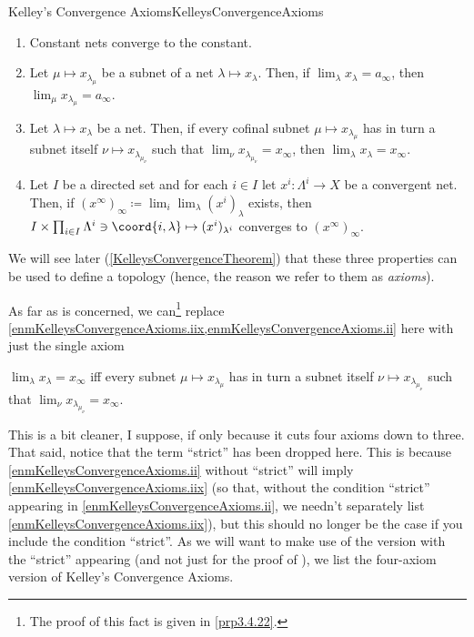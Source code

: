 \begin{thm}{Kelley's Convergence Axioms}{KelleysConvergenceAxioms}
\begin{enumerate}
\item \label{enmKelleysConvergenceAxioms.i}Constant nets converge to the constant.
\item \label{enmKelleysConvergenceAxioms.iix}Let $\mu \mapsto x_{\lambda _\mu}$ be a subnet of a net $\lambda \mapsto x_\lambda$.  Then, if $\lim _{\lambda}x_{\lambda}=a_{\infty}$, then $\lim _{\mu}x_{\lambda _{\mu}}=a_{\infty}$.
\item \label{enmKelleysConvergenceAxioms.ii}Let $\lambda \mapsto x_{\lambda}$ be a net.  Then, if every cofinal subnet $\mu \mapsto x_{\lambda _\mu}$ has in turn a subnet itself $\nu \mapsto x_{\lambda _{\mu _\nu}}$ such that $\lim _\nu x_{\lambda _{\mu _\nu}}=x_\infty$, then $\lim _\lambda x_\lambda =x_\infty$.
\item \label{enmKelleysConvergenceAxioms.iii}Let $I$ be a directed set and for each $i\in I$ let $x^i:\Lambda ^i\rightarrow X$ be a convergent net.  Then, if $(x^\infty )_\infty \coloneqq \lim _i\lim _\lambda (x^i)_\lambda$ exists, then $I\times \prod _{i\in I}\Lambda ^i\ni \coord{i,\lambda}\mapsto (x^i)_{\lambda ^i}$ converges to $(x^\infty )_\infty$.
\end{enumerate}
\begin{rmk}
We will see later (\cref{KelleysConvergenceTheorem}) that these three properties can be used to define a topology (hence, the reason we refer to them as \emph{axioms}).
\end{rmk}
\begin{rmk}
As far as  is concerned, we can\footnote{The proof of this fact is given in \cref{prp3.4.22}.} replace \cref{enmKelleysConvergenceAxioms.iix,enmKelleysConvergenceAxioms.ii} here with just the single axiom
\begin{textequation}
$\lim _{\lambda}x_{\lambda}=x_{\infty}$ iff every subnet $\mu \mapsto x_{\lambda _\mu}$ has in turn a subnet itself $\nu \mapsto x_{\lambda _{\mu _\nu}}$ such that $\lim _\nu x_{\lambda _{\mu _\nu}}=x_\infty$.
\end{textequation}
This is a bit cleaner, I suppose, if only because it cuts four axioms down to three.  That said, notice that the term ``strict'' has been dropped here.  This is because \cref{enmKelleysConvergenceAxioms.ii} without ``strict'' will imply \cref{enmKelleysConvergenceAxioms.iix} (so that, without the condition ``strict'' appearing in \cref{enmKelleysConvergenceAxioms.ii}, we needn't separately list \cref{enmKelleysConvergenceAxioms.iix}), but this should no longer be the case if you include the condition ``strict''.  As we will want to make use of the version with the ``strict'' appearing (and not just for the proof of ), we list the four-axiom version of Kelley's Convergence Axioms.
\end{rmk}
\end{thm}
